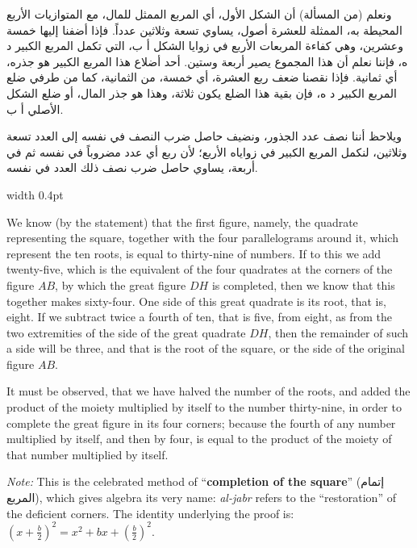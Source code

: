 \documentclass[11pt,a4paper,openany,oneside]{book}
\newcommand{\cnote}[1]{\textcolor{notecolor}{\textit{#1}}}
\newcommand{\ar}[1]{{\arabicfont\beginR #1\endR}}
\begin{document}
\noindent\begin{minipage}[t]{0.48\textwidth}
\raggedleft

\begin{Arabic}
ونعلم (من المسألة) أن الشكل الأول، أي المربع الممثل للمال، مع المتوازيات الأربع المحيطة به، الممثلة للعشرة أصول، يساوي تسعة وثلاثين عدداً. فإذا أضفنا إليها خمسة وعشرين، وهي كفاءة المربعات الأربع في زوايا الشكل أ ب، التي تكمل المربع الكبير د ه، فإننا نعلم أن هذا المجموع يصير أربعة وستين. أحد أضلاع هذا المربع الكبير هو جذره، أي ثمانية. فإذا نقصنا ضعف ربع العشرة، أي خمسة، من الثمانية، كما من طرفي ضلع المربع الكبير د ه، فإن بقية هذا الضلع يكون ثلاثة، وهذا هو جذر المال، أو ضلع الشكل الأصلي أ ب.

ويلاحظ أننا نصف عدد الجذور، ونضيف حاصل ضرب النصف في نفسه إلى العدد تسعة وثلاثين، لنكمل المربع الكبير في زواياه الأربع؛ لأن ربع أي عدد مضروباً في نفسه ثم في أربعة، يساوي حاصل ضرب نصف ذلك العدد في نفسه.
\end{Arabic}

\end{minipage}%
\hfill\vrule width 0.4pt\hfill
\begin{minipage}[t]{0.48\textwidth}
\raggedright

We know (by the statement) that the first figure, namely, the quadrate representing the square, together with the four parallelograms around it, which represent the ten roots, is equal to thirty-nine of numbers. If to this we add twenty-five, which is the equivalent of the four quadrates at the corners of the figure $AB$, by which the great figure $DH$ is completed, then we know that this together makes sixty-four. One side of this great quadrate is its root, that is, eight. If we subtract twice a fourth of ten, that is five, from eight, as from the two extremities of the side of the great quadrate $DH$, then the remainder of such a side will be three, and that is the root of the square, or the side of the original figure $AB$.

\vspace{0.3cm}

It must be observed, that we have halved the number of the roots, and added the product of the moiety multiplied by itself to the number thirty-nine, in order to complete the great figure in its four corners; because the fourth of any number multiplied by itself, and then by four, is equal to the product of the moiety of that number multiplied by itself.

\cnote{Note:} This is the celebrated method of ``\textbf{completion of the square}'' (\ar{إتمام المربع}), which gives algebra its very name: \textit{al-jabr} refers to the ``restoration'' of the deficient corners. The identity underlying the proof is: $\left(x + \frac{b}{2}\right)^2 = x^2 + bx + \left(\frac{b}{2}\right)^2$.

\end{minipage}
\vspace{0.3cm}
\end{document}
